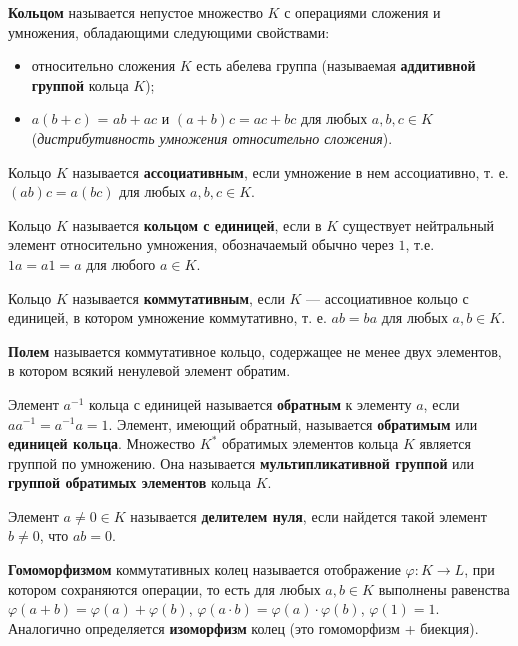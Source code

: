 

\date{}



\textbf{Кольцом} называется непустое множество \(K\) с операциями сложения и умножения, обладающими следующими свойствами:

\begin{itemize}
\tightlist
\item
  относительно сложения \(K\) есть абелева группа (называемая \textbf{аддитивной группой} кольца \(K\));
\item
  \(a(b+c)\) = \(ab+ac\) и \((a+b)c = ac+bc\) для любых \(a,b,c \in K\) (\emph{дистрибутивность умножения относительно сложения}).
\end{itemize}

Кольцо \(K\) называется \textbf{ассоциативным}, если умножение в нем ассоциативно, т. е. \((ab)c = a(bc)\) для любых \(a, b, c \in K\).

Кольцо \(K\) называется \textbf{кольцом с единицей}, если в \(K\) существует нейтральный элемент относительно умножения, обозначаемый обычно через \(1\), т.е. \(1a=a1=a\) для любого \(a\in K\).

Кольцо \(K\) называется \textbf{коммутативным}, если \(K\) --- ассоциативное кольцо с единицей, в котором умножение коммутативно, т. е. \(ab = ba\) для любых \(a, b \in K\).

\textbf{Полем} называется коммутативное кольцо, содержащее не менее двух элементов, в котором всякий ненулевой элемент обратим.

Элемент \(a^{-1}\) кольца с единицей называется \textbf{обратным} к элементу \(a\), если \(aa^{-1} = a^{-1}a = 1\). Элемент, имеющий обратный, называется \textbf{обратимым} или \textbf{единицей кольца}. Множество \(K^*\) обратимых элементов кольца \(K\) является группой по умножению. Она называется \textbf{мультипликативной группой} или \textbf{группой обратимых элементов} кольца \(K\).

Элемент \(a\neq 0\in K\) называется \textbf{делителем нуля}, если найдется такой элемент \(b \neq 0\), что \(ab=0\).

\textbf{Гомоморфизмом} коммутативных колец называется отображение \(\varphi: K \to L\), при котором сохраняются операции, то есть для любых \(a,b \in K\) выполнены равенства \(\varphi(a+b)=\varphi(a)+\varphi(b)\), \(\varphi(a\cdot b)=\varphi(a)\cdot \varphi(b)\), \(\varphi(1)=1\). Аналогично определяется \textbf{изоморфизм} колец (это гомоморфизм + биекция).

